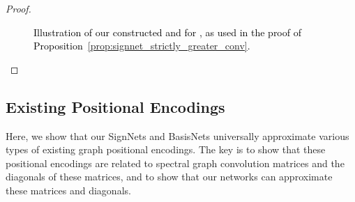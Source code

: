 \documentclass{article} \usepackage{iclr2023_conference,times}
\newcommand{\rebut}[1]{\textcolor{black}{#1}}
\begin{document}
\begin{proof}
\begin{figure}
\caption{\rebut{Illustration of our constructed  and  for , as used in the proof of Proposition~\ref{prop:signnet_strictly_greater_conv}.}}
\label{fig:example_graphs_2}
\end{figure}
    
\end{proof}

\subsection{Existing Positional Encodings}\label{appdx: existing PE}

Here, we show that our SignNets and BasisNets universally approximate various types of existing graph positional encodings. The key is to show that these positional encodings are related to spectral graph convolution matrices and the diagonals of these matrices, and to show that our networks can approximate these matrices and diagonals.
\end{document}
